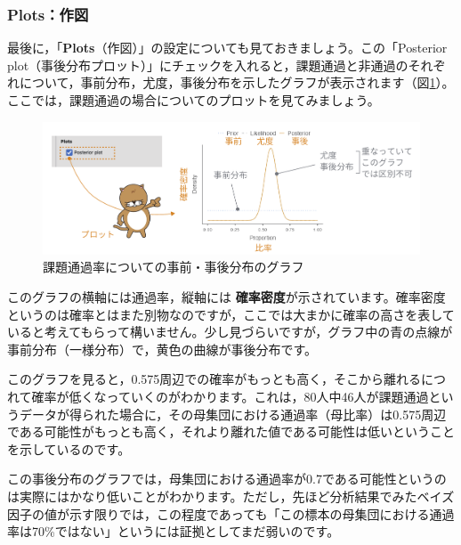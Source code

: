 \documentclass[
  12pt,
  a5jpaper,
  lualatex, ja=standard]{bxjsbook}
\renewcommand{\emph}[1]{\textbf{\color{emph} #1}}
\begin{document}
\hypertarget{subsub:frequencies-binomial-bayes-plots}{%
\subsubsection*{Plots：作図}\label{subsub:frequencies-binomial-bayes-plots}}

最後に，「\textbf{Plots}（作図）」の設定についても見ておきましょう。この「Posterior plot（事後分布プロット）」にチェックを入れると，課題通過と非通過のそれぞれについて，事前分布，尤度，事後分布を示したグラフが表示されます（図\ref{fig:frequencies-binomial-bayes-posterior}）。ここでは，課題通過の場合についてのプロットを見てみましょう。

\begin{figure}[!ht]

{\centering \includegraphics[width=1\linewidth]{images/frequencies/binomial-bayes-posterior} 

}

\caption{課題通過率についての事前・事後分布のグラフ}\label{fig:frequencies-binomial-bayes-posterior}
\end{figure}

このグラフの横軸には通過率，縦軸には\emph{確率密度}が示されています。確率密度というのは確率とはまた別物なのですが，ここでは大まかに確率の高さを表していると考えてもらって構いません。少し見づらいですが，グラフ中の青の点線が事前分布（一様分布）で，黄色の曲線が事後分布です。

このグラフを見ると，0.575周辺での確率がもっとも高く，そこから離れるにつれて確率が低くなっていくのがわかります。これは，80人中46人が課題通過というデータが得られた場合に，その母集団における通過率（母比率）は0.575周辺である可能性がもっとも高く，それより離れた値である可能性は低いということを示しているのです。

この事後分布のグラフでは，母集団における通過率が0.7である可能性というのは実際にはかなり低いことがわかります。ただし，先ほど分析結果でみたベイズ因子の値が示す限りでは，この程度であっても「この標本の母集団における通過率は70\%ではない」というには証拠としてまだ弱いのです。
\end{document}
